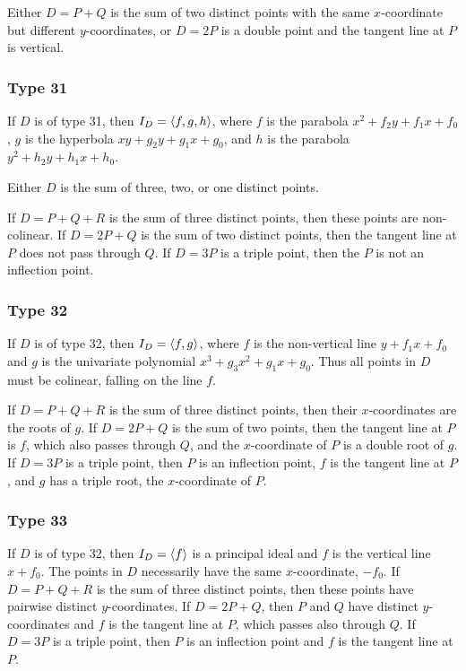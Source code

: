  Either $D = P + Q$ is the sum of two distinct points with the same $x$-coordinate but different $y$-coordinates,
  or $D = 2P$ is a double point and the tangent line at $P$ is vertical.

\subsubsection{Type 31}
  If $D$ is of type 31, then $I_D = \left\langle f, g, h \right\rangle$, where $f$ is the parabola $x^2 + f_2y + f_1x + f_0$,
  $g$ is the hyperbola $xy + g_2y + g_1x + g_0$, and $h$ is the parabola $y^2 + h_2y + h_1x + h_0$.
  
  Either $D$ is the sum of three, two, or one distinct points.
  
  If $D = P + Q + R$ is the sum of three distinct points, then these points are non-colinear.
  If $D = 2P + Q$ is the sum of two distinct points, then the tangent line at $P$ does not pass through $Q$.
  If $D = 3P$ is a triple point, then the $P$ is not an inflection point.

\subsubsection{Type 32}
  If $D$ is of type 32, then $I_D = \left\langle f, g \right\rangle$, where $f$ is the non-vertical line $y + f_1x + f_0$
  and $g$ is the univariate polynomial $x^3 + g_3x^2 + g_1x + g_0$.
  Thus all points in $D$ must be colinear, falling on the line $f$.
  
  If $D = P + Q + R$ is the sum of three distinct points, then their $x$-coordinates are the roots of $g$.
  If $D = 2P + Q$ is the sum of two points, then the tangent line at $P$ is $f$, which also passes through $Q$,
  and the $x$-coordinate of $P$ is a double root of $g$.
  If $D = 3P$ is a triple point, then $P$ is an inflection point, $f$ is the tangent line at $P$, and $g$ has a triple root,
  the $x$-coordinate of $P$.

\subsubsection{Type 33}
  If $D$ is of type 32, then $I_D = \left\langle f \right\rangle$ is a principal ideal and $f$ is the vertical line $x + f_0$.
  The points in $D$ necessarily have the same $x$-coordinate, $-f_0$.
  If $D = P + Q + R$ is the sum of three distinct points, then these points have pairwise distinct $y$-coordinates.
  If $D = 2P + Q$, then $P$ and $Q$ have distinct $y$-coordinates and $f$ is the tangent line at $P$, which passes also through $Q$.
  If $D = 3P$ is a triple point, then $P$ is an inflection point and $f$ is the tangent line at $P$.



